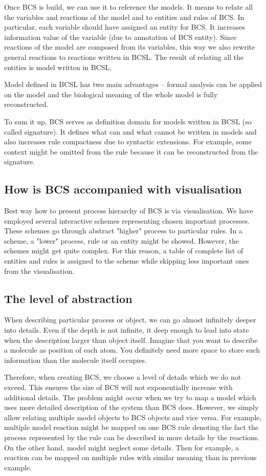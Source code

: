 \documentclass[12pt]{fithesis2}
\begin{document}
Once BCS is build, we can use it to reference the models. It means to relate all the variables and reactions of the model and to entities and rules of BCS. In particular, each variable should have assigned an entity for BCS. It increases information value of the variable (due to annotation of BCS entity). Since reactions of the model are composed from its variables, this way we also rewrite general reactions to reactions written in BCSL. The result of relating all the entities is model written in BCSL. 

Model defined in BCSL has two main advantages -- formal analysis can be applied on the model and the biological meaning of the whole model is fully reconstructed.

To sum it up, BCS serves as definition domain for models written in BCSL (so called signature). It defines what can and what cannot be written in models and also increases rule compactness due to syntactic extensions. For example, some context might be omitted from the rule because it can be reconstructed from the signature.


\subsection{How is BCS accompanied with visualisation}

Best way how to present process hierarchy of BCS is via visualisation. We have employed several interactive schemes representing chosen important processes. These schemes go through abstract "higher" process to particular rules. In a scheme, a "lower" process, rule or an entity might be showed. However, the schemes might get quite complex. For this reason, a table of complete list of entities and rules is assigned to the scheme while skipping less important ones from the visualisation.


\subsection{The level of abstraction}

When describing particular process or object, we can go almost infinitely deeper into details. Even if the depth is not infinite, it deep enough to lead into state when the description larger than object itself. Imagine that you want to describe a molecule as position of each atom. You definitely need more space to store such information than the molecule itself occupies.

Therefore, when creating BCS, we choose a level of details which we do not exceed. This ensures the size of BCS will not exponentially increase with additional details. The problem might occur when we try to map a model which uses more detailed description of the system than BCS does. However, we simply allow relating multiple model objects to BCS objects and vice versa. For example, multiple model reaction might be mapped on one BCS rule denoting the fact the process represented by the rule can be described in more details by the reactions. On the other hand, model might neglect some details. Then for example, a reaction can be mapped on multiple rules with similar meaning than in previous example.
\end{document}
